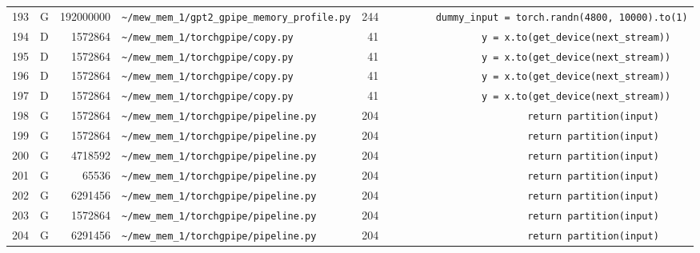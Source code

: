 \documentclass{article}
\begin{document}
\begin{longtable}{r l r p{6.5cm} r p{7.0cm}}
193 & G & 192000000 & \lstinline|~/mew_mem_1/gpt2_gpipe_memory_profile.py| & 244 & \lstinline|        dummy_input = torch.randn(4800, 10000).to(1)| \\
194 & D & 1572864 & \lstinline|~/mew_mem_1/torchgpipe/copy.py| & 41 & \lstinline|                y = x.to(get_device(next_stream))| \\
195 & D & 1572864 & \lstinline|~/mew_mem_1/torchgpipe/copy.py| & 41 & \lstinline|                y = x.to(get_device(next_stream))| \\
196 & D & 1572864 & \lstinline|~/mew_mem_1/torchgpipe/copy.py| & 41 & \lstinline|                y = x.to(get_device(next_stream))| \\
197 & D & 1572864 & \lstinline|~/mew_mem_1/torchgpipe/copy.py| & 41 & \lstinline|                y = x.to(get_device(next_stream))| \\
198 & G & 1572864 & \lstinline|~/mew_mem_1/torchgpipe/pipeline.py| & 204 & \lstinline|                        return partition(input)| \\
199 & G & 1572864 & \lstinline|~/mew_mem_1/torchgpipe/pipeline.py| & 204 & \lstinline|                        return partition(input)| \\
200 & G & 4718592 & \lstinline|~/mew_mem_1/torchgpipe/pipeline.py| & 204 & \lstinline|                        return partition(input)| \\
201 & G & 65536 & \lstinline|~/mew_mem_1/torchgpipe/pipeline.py| & 204 & \lstinline|                        return partition(input)| \\
202 & G & 6291456 & \lstinline|~/mew_mem_1/torchgpipe/pipeline.py| & 204 & \lstinline|                        return partition(input)| \\
203 & G & 1572864 & \lstinline|~/mew_mem_1/torchgpipe/pipeline.py| & 204 & \lstinline|                        return partition(input)| \\
204 & G & 6291456 & \lstinline|~/mew_mem_1/torchgpipe/pipeline.py| & 204 & \lstinline|                        return partition(input)| \\
\end{longtable}
\end{document}
